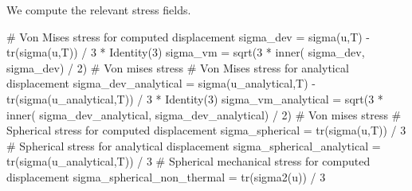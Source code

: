 We compute the relevant stress fields.
\begin{python}
# Von Mises stress for computed displacement
sigma_dev = sigma(u,T) - tr(sigma(u,T)) / 3 * Identity(3) 
sigma_vm = sqrt(3 * inner( sigma_dev, sigma_dev) / 2) # Von mises stress
# Von Mises stress for analytical displacement
sigma_dev_analytical = sigma(u_analytical,T) - tr(sigma(u_analytical,T)) / 3 * Identity(3)
sigma_vm_analytical = sqrt(3 * inner( sigma_dev_analytical, sigma_dev_analytical) / 2) # Von mises stress
# Spherical stress for computed displacement
sigma_spherical = tr(sigma(u,T)) / 3
# Spherical stress for analytical displacement
sigma_spherical_analytical = tr(sigma(u_analytical,T)) / 3
# Spherical mechanical stress for computed displacement
sigma_spherical_non_thermal = tr(sigma2(u)) / 3
\end{python}

